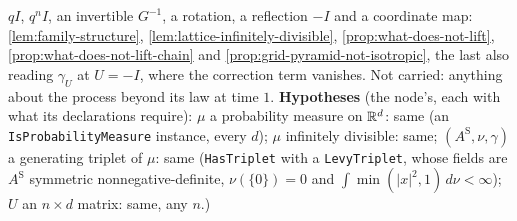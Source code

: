 \begin{theorem}
{$qI$, $q^nI$, an invertible $G^{-1}$, a rotation, a reflection $-I$ and a coordinate map:
\ref{lem:family-structure}, \ref{lem:lattice-infinitely-divisible},
\ref{prop:what-does-not-lift}, \ref{prop:what-does-not-lift-chain}
and \ref{prop:grid-pyramid-not-isotropic}, the last also reading $\gamma_U$ at $U = -I$, where the
correction term vanishes. Not carried: anything about the process beyond its law at time $1$.
\textbf{Hypotheses} (the node's, each with what its declarations require): $\mu$ a probability measure
on $\mathbb{R}^d$: same (an \texttt{IsProbabilityMeasure} instance, every $d$); $\mu$ infinitely
divisible: same; $(A^{\mathrm S}, \nu, \gamma)$ a generating triplet of $\mu$: same (\texttt{HasTriplet} with
a \texttt{LevyTriplet}, whose fields are $A^{\mathrm S}$ symmetric nonnegative-definite, $\nu(\{0\}) = 0$ and
$\int\min(|x|^2, 1)\,d\nu < \infty$); $U$ an $n \times d$ matrix: same, any $n$.)}
\end{theorem}

